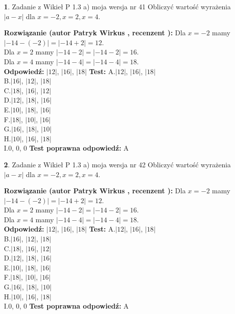 \documentclass[12pt, a4paper]{article}
\theoremstyle{definition} %
\newtheorem{zad}{}
\newcommand{\zadStart}[1]{\begin{zad}#1\newline}
\newcommand{\zadStop}{\end{zad}}
\newcommand{\rozwStart}[2]{\noindent \textbf{Rozwiązanie (autor #1 , recenzent #2): }\newline}
\newcommand{\rozwStop}{\newline}
\newcommand{\odpStart}{\noindent \textbf{Odpowiedź:}\newline}
\newcommand{\odpStop}{\newline}
\newcommand{\testStart}{\noindent \textbf{Test:}\newline}
\newcommand{\testStop}{\newline}
\newcommand{\kluczStart}{\noindent \textbf{Test poprawna odpowiedź:}\newline}
\newcommand{\kluczStop}{\newline}
\begin{document}
\zadStart{Zadanie z Wikieł P 1.3 a) moja wersja nr 41}
Obliczyć wartość wyrażenia $|a - x|$ dla $x=-2,x=2,x=4$.
\zadStop
\rozwStart{Patryk Wirkus}{}
Dla $x = -2$ mamy $|-14 - (-2)| = |-14 + 2| = 12$.\\
Dla $x = 2$ mamy $|-14 - 2| = |-14 - 2| = 16$.\\
Dla $x = 4$ mamy $|-14 - 4| = |-14 - 4| = 18$.\\
\rozwStop
\odpStart
$|12|$, $|16|$, $|18|$
\odpStop
\testStart
A.$|12|$, $|16|$, $|18|$\\
B.$|16|$, $|12|$, $|18|$\\
C.$|18|$, $|16|$, $|12|$\\
D.$|12|$, $|18|$, $|16|$\\
E.$|10|$, $|18|$, $|16|$\\
F.$|18|$, $|10|$, $|16|$\\
G.$|16|$, $|18|$, $|10|$\\
H.$|10|$, $|16|$, $|18|$\\
I.$0$, $0$, $0$
\testStop
\kluczStart
A
\kluczStop



\zadStart{Zadanie z Wikieł P 1.3 a) moja wersja nr 42}
Obliczyć wartość wyrażenia $|a - x|$ dla $x=-2,x=2,x=4$.
\zadStop
\rozwStart{Patryk Wirkus}{}
Dla $x = -2$ mamy $|-14 - (-2)| = |-14 + 2| = 12$.\\
Dla $x = 2$ mamy $|-14 - 2| = |-14 - 2| = 16$.\\
Dla $x = 4$ mamy $|-14 - 4| = |-14 - 4| = 18$.\\
\rozwStop
\odpStart
$|12|$, $|16|$, $|18|$
\odpStop
\testStart
A.$|12|$, $|16|$, $|18|$\\
B.$|16|$, $|12|$, $|18|$\\
C.$|18|$, $|16|$, $|12|$\\
D.$|12|$, $|18|$, $|16|$\\
E.$|10|$, $|18|$, $|16|$\\
F.$|18|$, $|10|$, $|16|$\\
G.$|16|$, $|18|$, $|10|$\\
H.$|10|$, $|16|$, $|18|$\\
I.$0$, $0$, $0$
\testStop
\kluczStart
A
\kluczStop
\end{document}
